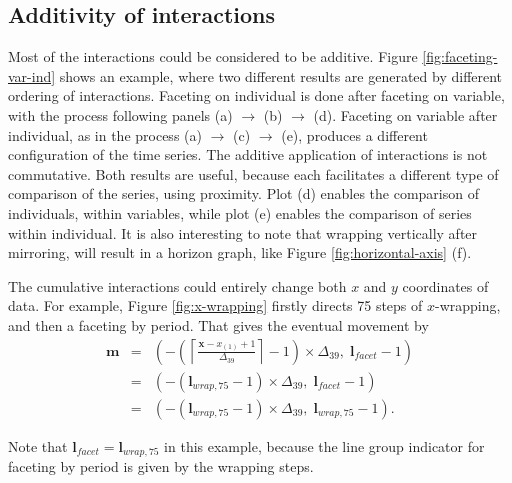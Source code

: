 \documentclass[12pt]{article}
\begin{document}


\subsection{Additivity of interactions\label{interaction-addition}}

Most of the interactions could be considered to be additive.
Figure \ref{fig:faceting-var-ind} shows an example, where two
different results are generated by different ordering of interactions.
Faceting on individual is done after faceting on variable, with the
process following panels (a) $\rightarrow$ (b) $\rightarrow$ (d).
Faceting on variable after individual, as in the process (a)
$\rightarrow$ (c) $\rightarrow$ (e), produces a different
configuration of the time series. The additive application of
interactions is not commutative. Both results are useful, because
each facilitates a different type of comparison of the series,
using proximity. Plot (d) enables the comparison of individuals,
within variables, while plot (e) enables the comparison of series
within individual. It is also interesting to
note that wrapping vertically after mirroring, will result in
a horizon graph, like Figure \ref{fig:horizontal-axis} (f).

The cumulative interactions could
entirely change both $x$ and $y$ coordinates of data.
For example, Figure \ref{fig:x-wrapping} firstly directs
75 steps of $x$-wrapping, and then a faceting by
period. That gives the eventual movement by
\begin{eqnarray*}
\mathbf{m} & = & (-\left(\left\lceil \frac{\mathbf{x}-x_{(1)}+1}{\Delta_{39}}\right\rceil -1\right)\times\Delta_{39}, \; \mathbf{l}{}_{facet}-1) \\
& = & (-(\mathbf{l}{}_{wrap,75} -1)\times\Delta_{39}, \; \mathbf{l}{}_{facet}-1) \\
& = & (-(\mathbf{l}{}_{wrap,75} -1)\times\Delta_{39}, \; \mathbf{l}{}_{wrap,75}-1).
\end{eqnarray*}

Note that $\mathbf{l}{}_{facet} = \mathbf{l}{}_{wrap,75}$
in this example, because the line group indicator for
faceting by period is given by the wrapping steps.
\end{document}
